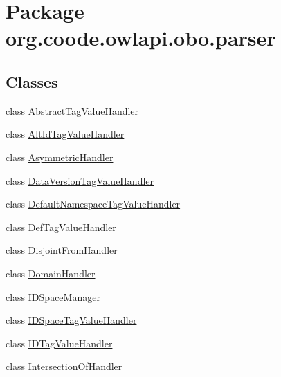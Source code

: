\hypertarget{namespaceorg_1_1coode_1_1owlapi_1_1obo_1_1parser}{\section{Package org.\-coode.\-owlapi.\-obo.\-parser}
\label{namespaceorg_1_1coode_1_1owlapi_1_1obo_1_1parser}
}
\subsection*{Classes}
\begin{DoxyCompactItemize}
\item 
class \hyperlink{classorg_1_1coode_1_1owlapi_1_1obo_1_1parser_1_1_abstract_tag_value_handler}{Abstract\-Tag\-Value\-Handler}
\item 
class \hyperlink{classorg_1_1coode_1_1owlapi_1_1obo_1_1parser_1_1_alt_id_tag_value_handler}{Alt\-Id\-Tag\-Value\-Handler}
\item 
class \hyperlink{classorg_1_1coode_1_1owlapi_1_1obo_1_1parser_1_1_asymmetric_handler}{Asymmetric\-Handler}
\item 
class \hyperlink{classorg_1_1coode_1_1owlapi_1_1obo_1_1parser_1_1_data_version_tag_value_handler}{Data\-Version\-Tag\-Value\-Handler}
\item 
class \hyperlink{classorg_1_1coode_1_1owlapi_1_1obo_1_1parser_1_1_default_namespace_tag_value_handler}{Default\-Namespace\-Tag\-Value\-Handler}
\item 
class \hyperlink{classorg_1_1coode_1_1owlapi_1_1obo_1_1parser_1_1_def_tag_value_handler}{Def\-Tag\-Value\-Handler}
\item 
class \hyperlink{classorg_1_1coode_1_1owlapi_1_1obo_1_1parser_1_1_disjoint_from_handler}{Disjoint\-From\-Handler}
\item 
class \hyperlink{classorg_1_1coode_1_1owlapi_1_1obo_1_1parser_1_1_domain_handler}{Domain\-Handler}
\item 
class \hyperlink{classorg_1_1coode_1_1owlapi_1_1obo_1_1parser_1_1_i_d_space_manager}{I\-D\-Space\-Manager}
\item 
class \hyperlink{classorg_1_1coode_1_1owlapi_1_1obo_1_1parser_1_1_i_d_space_tag_value_handler}{I\-D\-Space\-Tag\-Value\-Handler}
\item 
class \hyperlink{classorg_1_1coode_1_1owlapi_1_1obo_1_1parser_1_1_i_d_tag_value_handler}{I\-D\-Tag\-Value\-Handler}
\item 
class \hyperlink{classorg_1_1coode_1_1owlapi_1_1obo_1_1parser_1_1_intersection_of_handler}{Intersection\-Of\-Handler}

\end{DoxyCompactItemize}
